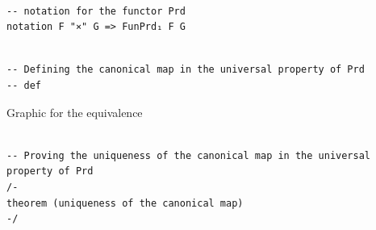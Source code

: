 \documentclass{book}
\newcounter{lcounter}
\begin{document}
\begin{center}
\begin{tcolorbox}[width=5in,colback={white},title={\begin{center}\texttt{Lean \thelcounter} \addtocounter{lcounter}{1}  \end{center}},colbacktitle=Blue,coltitle=black]
\begin{verbatim}

-- notation for the functor Prd
notation F "⨯" G => FunPrd₁ F G

\end{verbatim}%
\end{tcolorbox}
\end{center}


\begin{center}
\begin{tcolorbox}[width=5in,colback={white},title={\begin{center}\texttt{Lean \thelcounter} \addtocounter{lcounter}{1}  \end{center}},colbacktitle=Blue,coltitle=black]
\begin{verbatim}

-- Defining the canonical map in the universal property of Prd
-- def 

\end{verbatim}%
\end{tcolorbox}
\end{center}


\begin{center}
\begin{tcolorbox}[width=5in,colback={white},title={\begin{center} Graphic \addtocounter{lcounter}{1}  \end{center}},colbacktitle=Yellow,coltitle=black]

Graphic for the equivalence

\end{tcolorbox}
\end{center}


\begin{center}
\begin{tcolorbox}[width=5in,colback={white},title={\begin{center}\texttt{Lean \thelcounter} \addtocounter{lcounter}{1}  \end{center}},colbacktitle=Blue,coltitle=black]
\begin{verbatim}

-- Proving the uniqueness of the canonical map in the universal property of Prd
/-
theorem (uniqueness of the canonical map)
-/

\end{verbatim}%
\end{tcolorbox}
\end{center}
\end{document}
